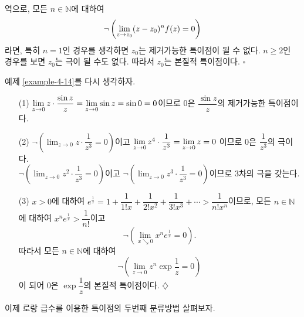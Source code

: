 역으로, 모든 $n\in\mathbb N$에 대하여
\[
 \neg\left( \lim\limits_{z\to z_0} (z-z_0)^{n} f(z) = 0 \right)
\]
라면, 특히 $n=1$인 경우를 생각하면 $z_0$는 제거가능한 특이점이 될 수 없다.
$n\ge2$인 경우를 보면 $z_0$는 극이 될 수도 없다.
따라서 $z_0$는 본질적 특이점이다. \hfill $\square$

예제 \ref{example-4-14}를 다시 생각하자.

\begin{saltexample}[label=example-4-15]{}{}

\begin{itemize}
\item[(1)] $\lim\limits_{z\to0} z \cdot \displaystyle\frac{\sin z}z = \lim\limits_{z\to0} \sin z 
= \sin 0 = 0$이므로 $0$은 $\dfrac{\sin z}z$의 제거가능한 특이점이다.
\item[(2)] $\neg\left(\lim_{z\to 0} z\cdot \dfrac1{z^3} = 0 \right)$이고
$\lim\limits_{z\to 0} z^4 \cdot \displaystyle\frac1{z^3} = \lim\limits_{z\to0} z = 0$ 이므로
$0$은 $\dfrac1{z^3}$의 극이다. \\
$\neg\left(\lim_{z\to 0} z^2\cdot \dfrac1{z^3} = 0 \right)$이고
$\neg\left(\lim_{z\to 0} z^3\cdot \dfrac1{z^3} = 0 \right)$이므로
$3$차의 극을 갖는다.
\item[(3)] $x>0$에 대하여
$e^{\frac1x} = 1 + \dfrac1{1!x} + \dfrac1{2!x^2} + \dfrac1{3!x^3} + \cdots
> \dfrac1{n!x^n}$이므로,
모든 $n\in\mathbb N$에 대하여 $x^ne^{\frac1x} > \dfrac1{n!}$이고
\[
\neg\left(\lim_{x\searrow 0} x^ne^{\frac1x} = 0 \right). 
\]
따라서  모든 $n\in\mathbb N$에 대하여
\[
\neg\left(\lim_{z\to 0} z^n\exp \frac1z = 0 \right)
\]
이 되어 $0$은 $\exp \dfrac 1z$의 본질적 특이점이다. 
\hfill $\diamondsuit$
\end{itemize}

이제 로랑 급수를 이용한 특이점의 두번째 분류방법 살펴보자.
\end{saltexample}

